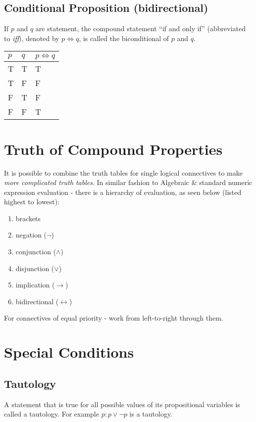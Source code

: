 \subsection{Conditional Proposition (bidirectional)}
If $p$ and $q$ are statement, the compound statement ``if and only if'' (abbreviated to \textit{iff}), denoted by $p \Leftrightarrow q$, is called the biconditional of $p$ and $q$. 
\begin{table}[H]
    \centering
    \begin{tabular}{C{0.1\textwidth} C{0.1\textwidth} C{0.1\textwidth}}
        $p$ & $q$ & $p \Leftrightarrow q$\\
        \hline
        \hline
        T & T & T\\
        \hline
        T & F & F \\
        \hline
        F & T & F \\
        \hline
        F & F & T\\
        \hline
    \end{tabular}
\end{table}

\section{Truth of Compound Properties}
It is possible to combine the truth tables for single logical connectives to make \textit{more complicated truth tables}. In similar fashion to Algebraic \& standard numeric expression evaluation - there is a hierarchy of evaluation, as seen below (listed highest to lowest):
\begin{enumerate}
    \item brackets
    \item negation ($\neg $)
    \item conjunction ($\wedge$)
    \item disjunction ($\vee$)
    \item implication ($\rightarrow$)
    \item bidirectional ($\leftrightarrow$)
\end{enumerate}
For connectives of equal priority - work from left-to-right through them.

\section{Special Conditions}
\subsection{Tautology}
A statement that is true for all possible values of its propositional variables is called a tautology. For example $p: p \vee \neg  p$ is a tautology.
